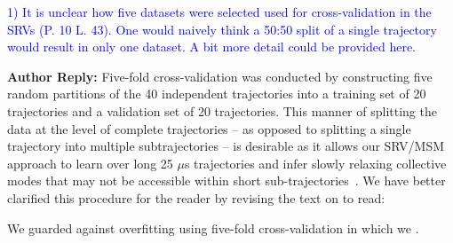 \documentclass[11pt,a4paper]{letter} %
\newcommand*{\rood}[1]{{\color{red}{#1}}}
\newcommand*{\noteg}[1]{\textcolor{green}{[[#1]]}}		%
\begin{document}







\textcolor{blue}{1)      It is unclear how five datasets were selected used for cross-validation in the SRVs (P. 10 L. 43). One would naively think a 50:50 split of a single trajectory would result in only one dataset. A bit more detail could be provided here.}

\textbf{Author Reply:}   Five-fold cross-validation was conducted by constructing five random partitions of the 40 independent trajectories into a training set of 20 trajectories and a validation set of 20 trajectories. This manner of splitting the data at the level of complete trajectories -- as opposed to splitting a single trajectory into multiple subtrajectories -- is desirable as it allows our SRV/MSM approach to learn over long 25 $\mu$s trajectories and infer slowly relaxing collective modes that may not be accessible within short sub-trajectories~\citep{Sidky2019High-ResolutionVAMPnets}. We have better clarified this procedure for the reader by revising the text on \rood{p.~10} to read: 

We guarded against overfitting using five-fold cross-validation in which we \rood{constructed five random partitions of the 40 independent simulation trajectories into a training set of 20 trajectories and a validation set of 20 trajectories}.\citep{Sidky2019High-ResolutionVAMPnets}
\end{document}

